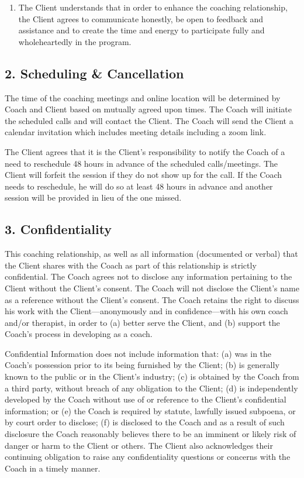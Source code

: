 \documentclass[11pt,letterpaper]{article}
\begin{document}
\begin{enumerate}[label=\alph*),leftmargin=*,itemsep=6pt]
\item The Client understands that in order to enhance the coaching relationship, the Client agrees to communicate honestly, be open to feedback and assistance and to create the time and energy to participate fully and wholeheartedly in the program.
\end{enumerate}

\subsection*{2. Scheduling \& Cancellation}

The time of the coaching meetings and online location will be determined by Coach and Client based on mutually agreed upon times. The Coach will initiate the scheduled calls and will contact the Client. The Coach will send the Client a calendar invitation which includes meeting details including a zoom link.

The Client agrees that it is the Client's responsibility to notify the Coach of a need to reschedule 48 hours in advance of the scheduled calls/meetings. The Client will forfeit the session if they do not show up for the call. If the Coach needs to reschedule, he will do so at least 48 hours in advance and another session will be provided in lieu of the one missed.

\subsection*{3. Confidentiality}

This coaching relationship, as well as all information (documented or verbal) that the Client shares with the Coach as part of this relationship is strictly confidential. The Coach agrees not to disclose any information pertaining to the Client without the Client's consent. The Coach will not disclose the Client's name as a reference without the Client's consent. The Coach retains the right to discuss his work with the Client---anonymously and in confidence---with his own coach and/or therapist, in order to (a) better serve the Client, and (b) support the Coach's process in developing as a coach.

Confidential Information does not include information that: (a) was in the Coach's possession prior to its being furnished by the Client; (b) is generally known to the public or in the Client's industry; (c) is obtained by the Coach from a third party, without breach of any obligation to the Client; (d) is independently developed by the Coach without use of or reference to the Client's confidential information; or (e) the Coach is required by statute, lawfully issued subpoena, or by court order to disclose; (f) is disclosed to the Coach and as a result of such disclosure the Coach reasonably believes there to be an imminent or likely risk of danger or harm to the Client or others. The Client also acknowledges their continuing obligation to raise any confidentiality questions or concerns with the Coach in a timely manner.
\end{document}

